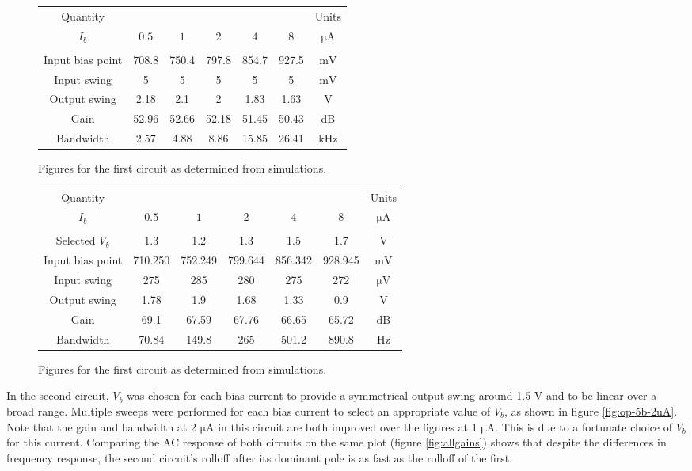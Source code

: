 \documentclass{article}
\begin{document}
\begin{figure}
\begin{tabular}{c | c c c c c | c}
Quantity          &       &       &       &       &       & Units          \\
$I_b$             & $0.5$ & $1$   & $2$   & $4$   & $8$   & $\mathrm{\mu A}$ \\
\hline \\
Input bias point  & 708.8 & 750.4 & 797.8 & 854.7 & 927.5 &$\mathrm{m V}$\\
Input swing       & 5     & 5     & 5     & 5     & 5     &$\mathrm{m V}$\\
Output swing      & 2.18  & 2.1   & 2     & 1.83  & 1.63  &$\mathrm{V}$ \\
Gain              & 52.96 & 52.66 & 52.18 & 51.45 & 50.43 & dB \\
Bandwidth         & 2.57  & 4.88  & 8.86  & 15.85 & 26.41 &$\mathrm{k Hz}$
\end{tabular}
\caption{Figures for the first circuit as determined from simulations.}
\end{figure}

\begin{figure}
\begin{tabular}{c | c c c c c | c}
Quantity          &         &         &         &         &         & Units          \\
$I_b$             & $0.5$   & $1$     & $2$     & $4$     & $8$     & $\mathrm{\mu A}$ \\
\hline \\
Selected $V_b$    & 1.3     & 1.2     & 1.3     & 1.5     & 1.7     &$\mathrm{V}$\\
Input bias point  & 710.250 & 752.249 & 799.644 & 856.342 & 928.945 &$\mathrm{m V}$\\
Input swing       & 275     & 285     & 280     & 275     & 272     &$\mathrm{\mu V}$\\
Output swing      & 1.78    & 1.9     & 1.68    & 1.33    & 0.9     &$\mathrm{V}$ \\
Gain              & 69.1    & 67.59   & 67.76   & 66.65   & 65.72   & dB \\
Bandwidth         & 70.84   & 149.8   & 265     & 501.2   & 890.8   &$\mathrm{Hz}$
\end{tabular}
\caption{Figures for the first circuit as determined from simulations.}
\end{figure}

In the second circuit, $V_b$ was chosen for each bias current to provide a 
symmetrical output swing around 1.5 V and to be linear over a broad range.
Multiple sweeps were performed for each bias current to select an appropriate
value of $V_b$, as shown in figure \ref{fig:op-5b-2uA}.
Note that the gain and bandwidth at 2 $\mathrm{\mu A}$ in this circuit
are both improved over the figures at 1 $\mathrm{\mu A}$. This is due to a 
fortunate choice of $V_b$ for this current. Comparing the AC response of
both circuits on the same plot (figure \ref{fig:allgains}) shows that 
despite the differences in frequency response, the second circuit's rolloff
after its dominant pole is as fast as the rolloff of the first.
\end{document}
